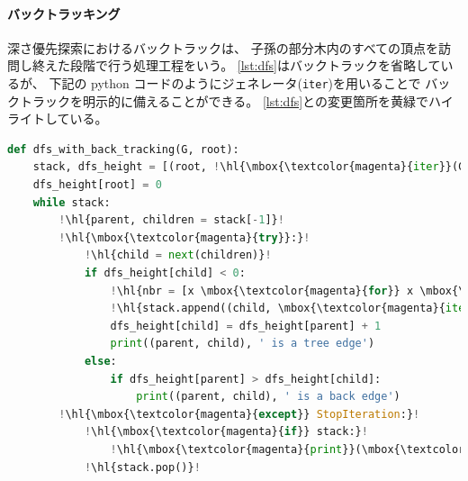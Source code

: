 


\paragraph{バックトラッキング}
深さ優先探索におけるバックトラックは、
子孫の部分木内のすべての頂点を訪問し終えた段階で行う処理工程をいう。
\lstrefname\ref{lst:dfs}はバックトラックを省略しているが、
下記の python コードのようにジェネレータ({\tt iter})を用いることで
バックトラックを明示的に備えることができる。
\lstrefname\ref{lst:dfs}との変更箇所を黄緑でハイライトしている。
\begin{lstlisting}[language=Python, caption=バックトラック付き深さ優先探索,
                   label=lst:dfs_back_track,escapechar=!]
def dfs_with_back_tracking(G, root):
    stack, dfs_height = [(root, !\hl{\mbox{\textcolor{magenta}{iter}}(G.neighbors(root)))}!], {x: -1 for x in G}
    dfs_height[root] = 0
    while stack:
        !\hl{parent, children = stack[-1]}!
        !\hl{\mbox{\textcolor{magenta}{try}}:}!
            !\hl{child = next(children)}!
            if dfs_height[child] < 0:
                !\hl{nbr = [x \mbox{\textcolor{magenta}{for}} x \mbox{\textcolor{magenta}{in}} G.neighbors(child) \mbox{\textcolor{magenta}{if}} x \mbox{\textcolor{magenta}{is not}} parent]}!
                !\hl{stack.append((child, \mbox{\textcolor{magenta}{iter}}(nbr)))}!
                dfs_height[child] = dfs_height[parent] + 1
                print((parent, child), ' is a tree edge')
            else:
                if dfs_height[parent] > dfs_height[child]:
                    print((parent, child), ' is a back edge')
        !\hl{\mbox{\textcolor{magenta}{except}} StopIteration:}!
            !\hl{\mbox{\textcolor{magenta}{if}} stack:}!
                !\hl{\mbox{\textcolor{magenta}{print}}(\mbox{\textcolor{codepurple}{'back tracking at'}}, stack[-1][0])}!
            !\hl{stack.pop()}!
\end{lstlisting}



